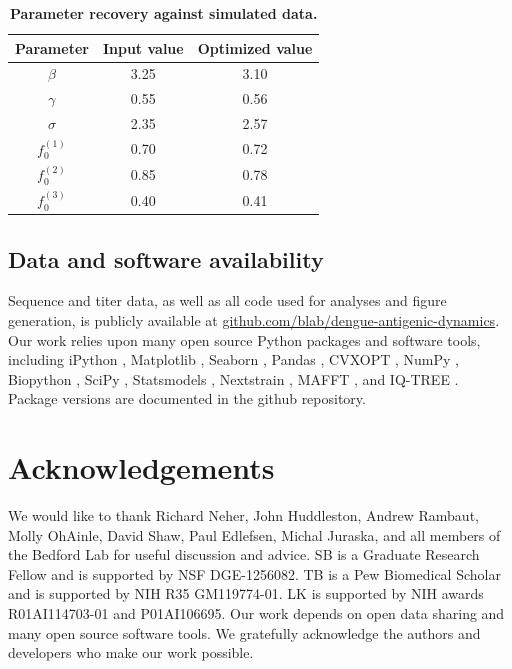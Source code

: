 \documentclass[11pt,oneside,letterpaper]{article}
\begin{document}
\begin{table}[ht!]
  \centering
  \caption{
    \textbf{Parameter recovery against simulated data.}
  }
  \label{simulation_parameters}
  \begin{tabular}{c c c}
    \hline
    Parameter     & Input value & Optimized value \\
    \hline
    $\beta$       & 3.25        & 3.10 \\
    $\gamma$      & 0.55        & 0.56 \\
    $\sigma$      & 2.35        & 2.57 \\
    $f_{0}^{(1)}$ & 0.70        & 0.72 \\
    $f_{0}^{(2)}$ & 0.85        & 0.78 \\
    $f_{0}^{(3)}$ & 0.40        & 0.41 \\
    \hline
  \end{tabular}
\end{table}


\subsection*{Data and software availability}
Sequence and titer data, as well as all code used for analyses and figure generation, is publicly available at \href{https://github.com/blab/dengue-antigenic-dynamics}{github.com/blab/dengue-antigenic-dynamics}.
Our work relies upon many open source Python packages and software tools, including iPython \citep{perez2007ipython}, Matplotlib \citep{Hunter2007computing}, Seaborn \citep{waskomseaborn}, Pandas \citep{mckinney2010data}, CVXOPT \citep{andersen2013cvxopt}, NumPy \citep{van2011numpy,gao2012implementing}, Biopython \citep{cock2009biopython}, SciPy \citep{jones2001scipy}, Statsmodels \citep{seabold2010statsmodels}, Nextstrain \citep{hadfield2018nextstrain}, MAFFT \citep{katoh2013mafft}, and IQ-TREE \citep{nguyen2014iq}.
Package versions are documented in the github repository.

\section*{Acknowledgements}
We would like to thank Richard Neher, John Huddleston, Andrew Rambaut, Molly OhAinle, David Shaw, Paul Edlefsen, Michal Juraska, and all members of the Bedford Lab for useful discussion and advice.
SB is a Graduate Research Fellow and is supported by NSF DGE-1256082.
TB is a Pew Biomedical Scholar and is supported by NIH R35 GM119774-01.
LK is supported by NIH awards R01AI114703-01 and P01AI106695.
Our work depends on open data sharing and many open source software tools.
We gratefully acknowledge the authors and developers who make our work possible.
\end{document}
